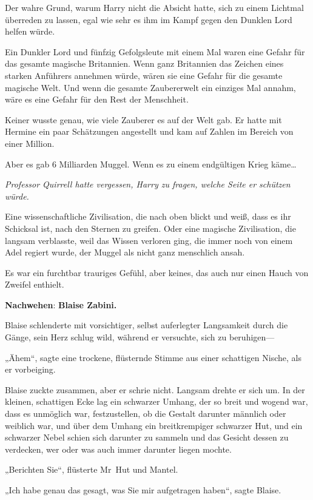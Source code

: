 {Der wahre Grund, warum Harry nicht die Absicht hatte, sich zu einem Lichtmal überreden zu lassen, egal wie sehr es ihm im Kampf gegen den Dunklen Lord helfen würde.

Ein Dunkler Lord und fünfzig Gefolgsleute mit einem Mal waren eine Gefahr für das gesamte magische Britannien. Wenn ganz Britannien das Zeichen eines starken Anführers annehmen würde, wären sie eine Gefahr für die gesamte magische Welt. Und wenn die gesamte Zaubererwelt ein einziges Mal annahm, wäre es eine Gefahr für den Rest der Menschheit.

Keiner wusste genau, wie viele Zauberer es auf der Welt gab. Er hatte mit Hermine ein paar Schätzungen angestellt und kam auf Zahlen im Bereich von einer Million.

Aber es gab 6 Milliarden Muggel. Wenn es zu einem endgültigen Krieg käme…

\emph{Professor Quirrell hatte vergessen, Harry zu fragen, welche Seite er schützen würde.}

Eine wissenschaftliche Zivilisation, die nach oben blickt und weiß, dass es ihr Schicksal ist, nach den Sternen zu greifen. Oder eine magische Zivilisation, die langsam verblasste, weil das Wissen verloren ging, die immer noch von einem Adel regiert wurde, der Muggel als nicht ganz menschlich ansah.

Es war ein furchtbar trauriges Gefühl, aber keines, das auch nur einen Hauch von Zweifel enthielt.

\textbf{Nachwehen}: \textbf{Blaise Zabini.}

Blaise schlenderte mit vorsichtiger, selbst auferlegter Langsamkeit durch die Gänge, sein Herz schlug wild, während er versuchte, sich zu beruhigen—

„Ähem“, sagte eine trockene, flüsternde Stimme aus einer schattigen Nische, als er vorbeiging.

Blaise zuckte zusammen, aber er schrie nicht. Langsam drehte er sich um. In der kleinen, schattigen Ecke lag ein schwarzer Umhang, der so breit und wogend war, dass es unmöglich war, festzustellen, ob die Gestalt darunter männlich oder weiblich war, und über dem Umhang ein breitkrempiger schwarzer Hut, und ein schwarzer Nebel schien sich darunter zu sammeln und das Gesicht dessen zu verdecken, wer oder was auch immer darunter liegen mochte.

„Berichten Sie“, flüsterte Mr~Hut und Mantel.

„Ich habe genau das gesagt, was Sie mir aufgetragen haben“, sagte Blaise.

}

